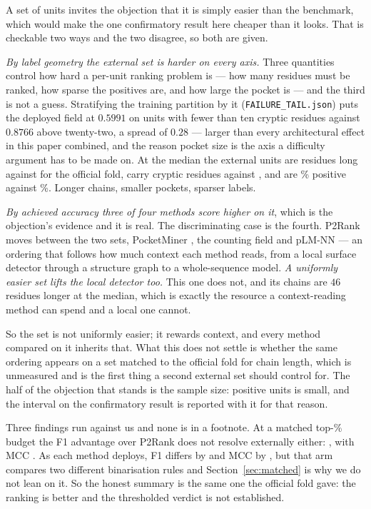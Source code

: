 \documentclass[11pt]{article}
\begin{document}
A set of \ExtN{} units invites the objection that it is simply easier than the
benchmark, which would make the one confirmatory result here cheaper than it
looks. That is checkable two ways and the two disagree, so both are given.

\emph{By label geometry the external set is harder on every axis.} Three
quantities control how hard a per-unit ranking problem is --- how many residues
must be ranked, how sparse the positives are, and how large the pocket is --- and
the third is not a guess. Stratifying the training partition by it
(\texttt{FAILURE\_TAIL.json}) puts the deployed field at \(0.5991\) on units
with fewer than ten cryptic residues against \(0.8766\) above twenty-two, a
spread of \(0.28\) --- larger than every architectural effect in this paper
combined, and the reason pocket size is the axis a difficulty argument has to
be made on. At the median the external units are \ExtDiffLenExt{} residues
long against \ExtDiffLenOff{} for the official fold, carry \ExtDiffCryExt{}
cryptic residues against \ExtDiffCryOff{}, and are \ExtDiffRateExt{}\% positive
against \ExtDiffRateOff{}\%. Longer chains, smaller pockets, sparser labels.

\emph{By achieved accuracy three of four methods score higher on it}, which is
the objection's evidence and it is real. The discriminating case is the fourth.
P2Rank moves \ExtDiffMovedPtwoR{} between the two sets, PocketMiner
\ExtDiffMovedPm{}, the counting field \ExtDiffMovedOurs{} and pLM-NN
\ExtDiffMovedPlm{} --- an ordering that follows how much context each method
reads, from a local surface detector through a structure graph to a
whole-sequence model. \emph{A uniformly easier set lifts the local detector too.}
This one does not, and its chains are \(46\) residues longer at the median, which
is exactly the resource a context-reading method can spend and a local one
cannot.

So the set is not uniformly easier; it rewards context, and every method compared
on it inherits that. What this does not settle is whether the same ordering
appears on a set matched to the official fold for chain length, which is
unmeasured and is the first thing a second external set should control for. The
half of the objection that stands is the sample size: \ExtN{} positive units is
small, and the interval on the confirmatory result is reported with it for that
reason.

Three findings run against us and none is in a footnote. At a matched
top-\ExtQPct{}\% budget the F1 advantage over P2Rank does not resolve externally
either: \ExtBudgetFDelta{} \ExtBudgetFCI{}, with MCC \ExtBudgetMDelta{}
\ExtBudgetMCI{}. As each method deploys, F1 differs by \ExtDeployedFDelta{}
\ExtDeployedFCI{} and MCC by \ExtDeployedMDelta{} \ExtDeployedMCI{}, but that arm
compares two different binarisation rules and Section~\ref{sec:matched} is why we
do not lean on it. So the honest summary is the same one the official fold gave:
the ranking is better and the thresholded verdict is not established.
\end{document}
